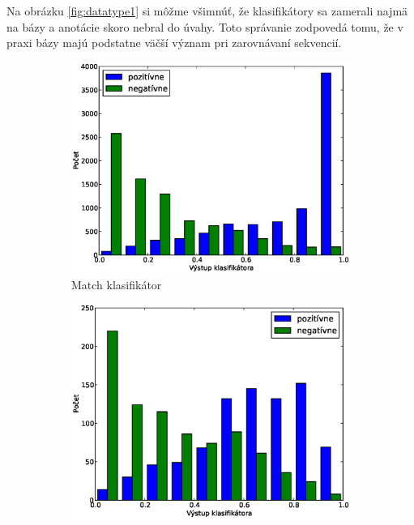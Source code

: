 Na obrázku \ref{fig:datatype1} si môžme všimnúť, že klasifikátory sa zamerali najmä na bázy a anotácie skoro nebral do úvahy.
Toto správanie zodpovedá tomu, že v praxi bázy majú podstatne väčší význam pri zarovnávaní sekvencií.

\begin{figure}[htp]
        \centering
        \begin{subfigure}[t]{0.4\textwidth}
                \includegraphics[width=\textwidth]{images/clf_fi/randomforest5_test}
                \caption{Match klasifikátor}
                \label{fig:datatype1-out-m}
        \end{subfigure}%
        \qquad\qquad %
        \begin{subfigure}[t]{0.4\textwidth}
                \includegraphics[width=\textwidth]{images/clf_fi/randomforest5_indel_test}

\end{subfigure}
\end{figure}
